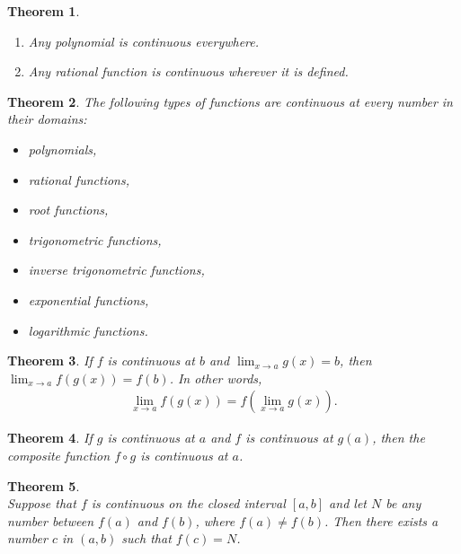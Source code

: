 \documentclass{article}
\theoremstyle{sltheorem}
\newtheorem{theorem}{Theorem}[section]
\begin{document}
\begin{theorem}
    \begin{enumerate}
        \item Any polynomial is continuous everywhere.
        \item Any rational function is continuous wherever it is defined.
    \end{enumerate}
\end{theorem}
\begin{theorem}
    The following types of functions are continuous at every number in their domains:
    \begin{itemize}
        \item polynomials,
        \item rational functions,
        \item root functions,
        \item trigonometric functions,
        \item inverse trigonometric functions,
        \item exponential functions,
        \item logarithmic functions.
    \end{itemize}
\end{theorem}
\begin{theorem}
    If $f$ is continuous at $b$ and $\lim_{x\to a}g(x) = b$, then $\lim_{x\to a}f(g(x))=f(b)$. In other words,
    \begin{align*}
        \lim_{x\to a}f(g(x))=f\left(\lim_{x\to a}g(x)\right).
    \end{align*}
\end{theorem}
\begin{theorem}
    If $g$ is continuous at $a$ and $f$ is continuous at $g(a)$, then the composite function $f\circ g$ is continuous at $a$.
\end{theorem}
\begin{theorem}
    \\
    Suppose that $f$ is continuous on the closed interval $[a,b]$ and let $N$ be any number between $f(a)$ and $f(b)$, where $f(a)\not=f(b)$. Then there exists a number $c$ in $(a,b)$ such that $f(c)=N$.
\end{theorem}
\end{document}
